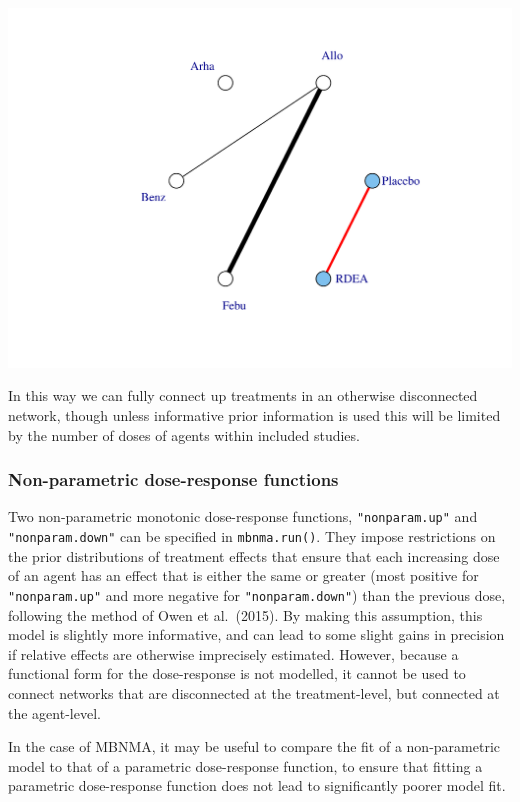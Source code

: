 \documentclass[]{article}
\begin{document}
\includegraphics{mbnmadose_files/figure-latex/unnamed-chunk-30-2.pdf}

In this way we can fully connect up treatments in an otherwise
disconnected network, though unless informative prior information is
used this will be limited by the number of doses of agents within
included studies.

\hypertarget{non-parametric-dose-response-functions}{%
\subsubsection{Non-parametric dose-response
functions}\label{non-parametric-dose-response-functions}}

Two non-parametric monotonic dose-response functions,
\texttt{"nonparam.up"} and \texttt{"nonparam.down"} can be specified in
\texttt{mbnma.run()}. They impose restrictions on the prior
distributions of treatment effects that ensure that each increasing dose
of an agent has an effect that is either the same or greater (most
positive for \texttt{"nonparam.up"} and more negative for
\texttt{"nonparam.down"}) than the previous dose, following the method
of Owen et al.~(2015). By making this assumption, this model is slightly
more informative, and can lead to some slight gains in precision if
relative effects are otherwise imprecisely estimated. However, because a
functional form for the dose-response is not modelled, it cannot be used
to connect networks that are disconnected at the treatment-level, but
connected at the agent-level.

In the case of MBNMA, it may be useful to compare the fit of a
non-parametric model to that of a parametric dose-response function, to
ensure that fitting a parametric dose-response function does not lead to
significantly poorer model fit.
\end{document}
